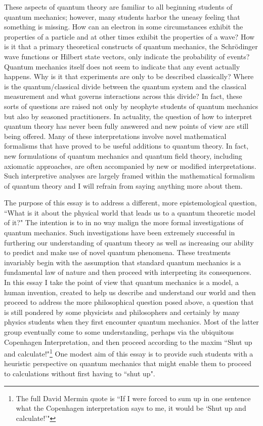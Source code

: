 \documentclass[12pt]{article}
\begin{document}
These aspects of quantum theory are familiar to all beginning students of quantum mechanics; however, many students harbor the uneasy feeling that something is missing.  How can an electron in some circumstances exhibit the properties of a particle and at other times exhibit the properties of a wave?  How is it that a primary theoretical constructs of quantum mechanics, the Schr\"{o}dinger wave functions or Hilbert state vectors, only indicate the probability of events?  Quantum mechanics itself does not seem to indicate that any event actually happens.  Why is it that experiments are only to be described classically?  Where is the quantum/classical divide between the quantum system and the classical measurement and what governs interactions across this divide?  In fact, these sorts of questions are raised not only by neophyte students of quantum mechanics but also by seasoned practitioners.  In actuality, the question of how to interpret quantum theory has never been fully answered and new points of view are still being offered.  Many of these interpretations involve novel mathematical formalisms that have proved to be useful additions to quantum theory.  In fact, new formulations of quantum mechanics and quantum field theory, including axiomatic approaches, are often accompanied by new or modified interpretations.   Such interpretive analyses are largely framed within the mathematical formalism of quantum theory and I will refrain from saying anything more about them.

The purpose of this essay is to address a different, more epistemological question, ``What is it about the physical world that leads us to a quantum theoretic model of it?"  The intention is to in no way malign the more formal investigations of quantum mechanics.  Such investigations have been extremely successful in furthering our understanding of quantum theory as well as increasing our ability to predict and make use of novel quantum phenomena.  These treatments invariably begin with the assumption that standard quantum mechanics is a fundamental law of nature and then proceed with interpreting its consequences. In this essay I take the point of view that quantum mechanics is a model, a human invention, created to help us describe and understand our world and then proceed to address the more philosophical question posed above, a question that is still pondered by some physicists and philosophers and certainly by many physics students when they first encounter quantum mechanics. Most of the latter group eventually come to some understanding, perhaps via the ubiquitous Copenhagen Interpretation, and then proceed according to the maxim ``Shut up and calculate!"\footnote{The full David Mermin quote is ``If I were forced to sum up in one sentence what the Copenhagen interpretation says to me, it would be `Shut up and calculate!'"\cite{Me1989}} One modest aim of this essay is to provide such students with a heuristic perspective on quantum mechanics that might enable them to proceed to calculations without first having to ``shut up".
\end{document}
